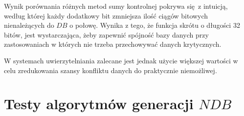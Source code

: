 Wynik porównania różnych metod sumy kontrolnej pokrywa się z intuicją, według której każdy dodatkowy bit zmniejsza ilość ciągów bitowych
nienależących do $DB$ o połowę. Wynika z tego, że funkcja skrótu o długości 32 bitów, jest wystarczająca, żeby zapewnić spójność bazy danych
przy zastosowaniach w których nie trzeba przechowywać danych krytycznych.

W systemach uwierzytelniania zalecane jest jednak użycie większej wartości w celu zredukowania szansy konfliktu danych do praktycznie niemożliwej.  

\section{Testy algorytmów generacji $NDB$}
